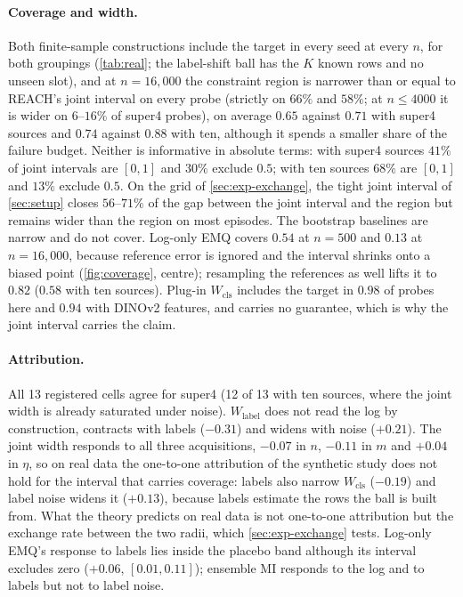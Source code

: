 \documentclass[twoside]{article}
\newcommand{\Wcls}{\ensuremath{W_{\mathrm{cls}}}}
\newcommand{\Wlab}{\ensuremath{W_{\mathrm{label}}}}
\begin{document}
\paragraph{Coverage and width.} Both finite-sample constructions include the target in every seed at every
$n$, for both groupings (\cref{tab:real}; the label-shift ball has the $K$ known rows and no unseen slot),
and at $n=16{,}000$ the constraint region is narrower than or equal to REACH's joint interval on every
probe (strictly on $66\%$ and $58\%$; at $n\le4000$ it is wider on $6$--$16\%$ of super4 probes), on average $0.65$ against $0.71$ with super4 sources and $0.74$ against $0.88$ with
ten, although it spends a smaller share of the failure budget. Neither is informative in absolute
terms: with super4 sources $41\%$ of joint intervals are $[0,1]$ and $30\%$ exclude $0.5$; with ten
sources $68\%$ are $[0,1]$ and $13\%$ exclude $0.5$. On the grid of \cref{sec:exp-exchange}, the tight joint
interval of \cref{sec:setup} closes $56$--$71\%$ of the gap between the joint interval and the region but
remains wider than the region on most episodes. The bootstrap baselines are narrow and do not cover. Log-only
EMQ covers $0.54$ at $n=500$ and $0.13$ at $n=16{,}000$, because reference error is ignored and the
interval shrinks onto a biased point (\cref{fig:coverage}, centre); resampling the references as well
lifts it to $0.82$ ($0.58$ with ten sources). Plug-in $\Wcls$ includes the target in $0.98$ of probes here and $0.94$ with
DINOv2 features, and carries no guarantee, which is why the joint interval carries the claim.

\paragraph{Attribution.} All 13 registered cells agree for super4 (12 of 13 with ten sources, where the
joint width is already saturated under noise). $\Wlab$ does not read the log by construction, contracts
with labels ($-0.31$) and widens with noise ($+0.21$). The joint width responds to all three
acquisitions, $-0.07$ in $n$, $-0.11$ in $m$ and $+0.04$ in $\eta$, so on real data the one-to-one
attribution of the synthetic study does not hold for the interval that carries coverage: labels also
narrow $\Wcls$ ($-0.19$) and label noise widens it ($+0.13$), because labels estimate the rows the ball
is built from. What the theory predicts on real data is not one-to-one attribution but the exchange
rate between the two radii, which \cref{sec:exp-exchange} tests. Log-only EMQ's response
to labels lies inside the placebo band although its interval excludes zero ($+0.06$, $[0.01,0.11]$);
ensemble MI responds to the log and to labels but not to label noise.
\end{document}
